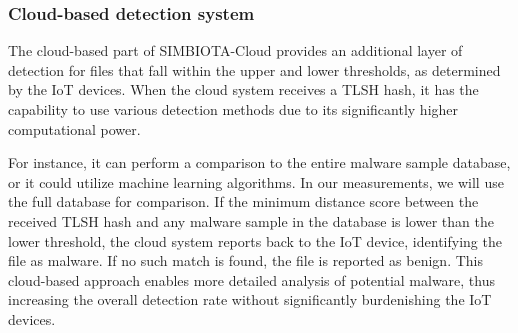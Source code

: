 \documentclass[
	a4paper, %
	10pt, %
	unnumberedsections, %
	twoside, %
]{LTJournalArticle}
\begin{document}
\subsubsection{Cloud-based detection system}
The cloud-based part of SIMBIOTA-Cloud provides an additional layer of detection for files that fall within the upper and lower thresholds, as determined by the IoT devices. When the cloud system receives a TLSH hash, it has the capability to use various detection methods due to its significantly higher computational power.

For instance, it can perform a comparison to the entire malware sample database, or it could utilize machine learning algorithms. In our measurements, we will use the full database for comparison. If the minimum distance score between the received TLSH hash and any malware sample in the database is lower than the lower threshold, the cloud system reports back to the IoT device, identifying the file as malware. If no such match is found, the file is reported as benign. This cloud-based approach enables more detailed analysis of potential malware, thus increasing the overall detection rate without significantly burdenishing the IoT devices.








\printbibliography %

\end{document}
